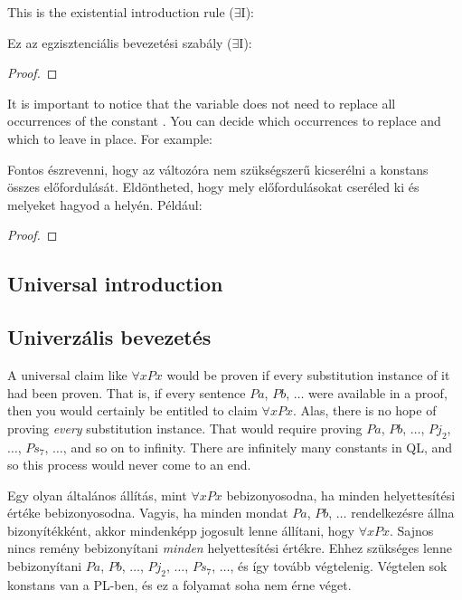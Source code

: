 

This is the existential introduction rule ($\exists$I):

Ez az egzisztenciális bevezetési szabály ($\exists$I):

\begin{proof}
	 
\end{proof}

It is important to notice that the variable  does not need to replace all occurrences of the constant . You can decide which occurrences to replace and which to leave in place.
For example:

Fontos észrevenni, hogy az  változóra nem szükségszerű kicserélni a  konstans összes előfordulását. Eldöntheted, hogy mely előfordulásokat cseréled ki és melyeket hagyod a helyén.
Például: 
\nopagebreak
\begin{proof}
	 
	 
	 
	 
	 
\end{proof}

\subsection{Universal introduction}
\subsection*{Univerzális bevezetés}
A universal claim like $\forall x Px$ would be proven if {every} substitution instance of it had been proven. That is, if every sentence $Pa$, $Pb$, $\ldots$ were available in a proof, then you would certainly be entitled to claim $\forall x Px$. Alas, there is no hope of proving \emph{every} substitution instance. That would require proving $Pa$, $Pb$, $\ldots$, $Pj_2$, $\ldots$, $Ps_7$, $\ldots$, and so on to infinity. There are infinitely many constants in QL, and so this process would never come to an end.

Egy olyan általános állítás, mint $\forall x Px$ bebizonyosodna, ha {minden} helyettesítési értéke bebizonyosodna. Vagyis, ha minden mondat $Pa$, $Pb$, $\ldots$ rendelkezésre állna bizonyítékként, akkor mindenképp jogosult lenne állítani, hogy $\forall x Px$. Sajnos nincs remény bebizonyítani \emph{minden} helyettesítési értékre. Ehhez szükséges lenne bebizonyítani $Pa$, $Pb$, $\ldots$, $Pj_2$, $\ldots$, $Ps_7$, $\ldots$, és így tovább végtelenig. Végtelen sok konstans van a PL-ben, és ez a folyamat soha nem érne véget.


